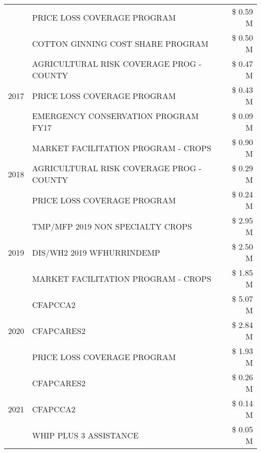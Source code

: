 \begin{tabular}{llr}
 & PRICE LOSS COVERAGE PROGRAM & \$ 0.59 M \\
 & COTTON GINNING COST SHARE PROGRAM & \$ 0.50 M \\
\cline{1-3}
\multirow[t]{3}{*}{2017} & AGRICULTURAL RISK COVERAGE PROG - COUNTY & \$ 0.47 M \\
 & PRICE LOSS COVERAGE PROGRAM & \$ 0.43 M \\
 & EMERGENCY CONSERVATION PROGRAM FY17 & \$ 0.09 M \\
\cline{1-3}
\multirow[t]{3}{*}{2018} & MARKET FACILITATION PROGRAM - CROPS & \$ 0.90 M \\
 & AGRICULTURAL RISK COVERAGE PROG - COUNTY & \$ 0.29 M \\
 & PRICE LOSS COVERAGE PROGRAM & \$ 0.24 M \\
\cline{1-3}
\multirow[t]{3}{*}{2019} & TMP/MFP 2019 NON SPECIALTY CROPS & \$ 2.95 M \\
 & DIS/WH2 2019 WFHURRINDEMP & \$ 2.50 M \\
 & MARKET FACILITATION PROGRAM - CROPS & \$ 1.85 M \\
\cline{1-3}
\multirow[t]{3}{*}{2020} & CFAPCCA2 & \$ 5.07 M \\
 & CFAPCARES2 & \$ 2.84 M \\
 & PRICE LOSS COVERAGE PROGRAM & \$ 1.93 M \\
\cline{1-3}
\multirow[t]{3}{*}{2021} & CFAPCARES2 & \$ 0.26 M \\
 & CFAPCCA2 & \$ 0.14 M \\
 & WHIP PLUS 3 ASSISTANCE & \$ 0.05 M \\
\cline{1-3}
\bottomrule
\end{tabular}
